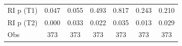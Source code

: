 {\begin{tabular}{l*{6}{c}}
RI p (T1)           &       0.047         &       0.055         &       0.493         &       0.817         &       0.243         &       0.210         \\
RI p (T2)           &       0.000         &       0.033         &       0.022         &       0.035         &       0.013         &       0.029         \\
Obs                 &         373         &         373         &         373         &         373         &         373         &         373         \\
\bottomrule
\end{tabular}
}
